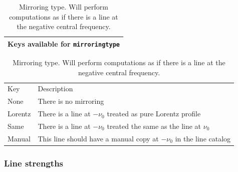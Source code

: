 \begin{table}[ht!]
 \centering
 \begin{tabular}{c}
  Keys available for \verb|mirroringtype|\\\hline
 \end{tabular}
 \begin{tabular}{ll}
  Key&Description\\
  None&There is no mirroring\\
  Lorentz&There is a line at $-\nu_0$ treated as pure Lorentz profile\\
  Same&There is a line at $-\nu_0$ treated the same as the line at $\nu_0$\\
  Manual&This line should have a manual copy at $-\nu_0$ in the line catalog
 \end{tabular}
 \caption{Mirroring type.  Will perform computations as if there is a line at the
 negative central frequency.}
 \label{tab:abs_theory:lineshape:mirroringtype}
\end{table}

\subsubsection{Line strengths}

